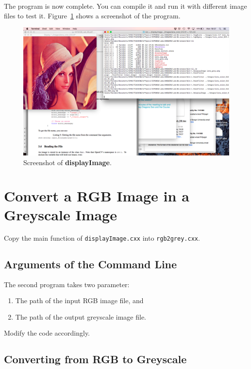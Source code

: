 \documentclass[english,a4paper,12pt,oneside]{article}
\begin{document}
The program is now complete. 
You can compile it and run it with different image files to test it.
Figure~\ref{fig:displayImage} shows a screenshot of the program. 

    \begin {figure}[htb]
			\centering
			\includegraphics[width=\textwidth]{displayImage}
      \caption{\label{fig:displayImage}Screenshot of \textbf{displayImage}.}
    \end {figure}

\section{Convert a RGB Image in a Greyscale Image}

Copy the main function of \verb+displayImage.cxx+ into \verb+rgb2grey.cxx+.

\subsection{Arguments of the Command Line}

The second program takes two parameter:
\begin{enumerate}
 \item  The path of the input RGB image file, and
 \item  The path of the output greyscale image file.
\end{enumerate}
Modify the code accordingly. 


\subsection{Converting from RGB to Greyscale}
\end{document}
